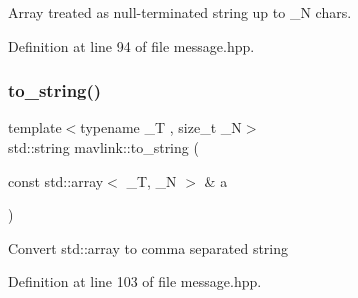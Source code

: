 Array treated as null-\/terminated string up to \+\_\+N chars. 

Definition at line 94 of file message.\+hpp.

\mbox{\label{namespacemavlink_a9bf01b56d8e27c1ef4df5f0333aafedc}} 
\subsubsection{\texorpdfstring{to\_string()}{to\_string()}\hspace{0.1cm}{\footnotesize\ttfamily [2/2]}}
{\footnotesize\ttfamily template$<$typename \+\_\+T , size\+\_\+t \+\_\+N$>$ \\
std\+::string mavlink\+::to\+\_\+string (\begin{DoxyParamCaption}\item[{const std\+::array$<$ \+\_\+T, \+\_\+N $>$ \&}]{a }\end{DoxyParamCaption})}

Convert std\+::array to comma separated string 

Definition at line 103 of file message.\+hpp.

